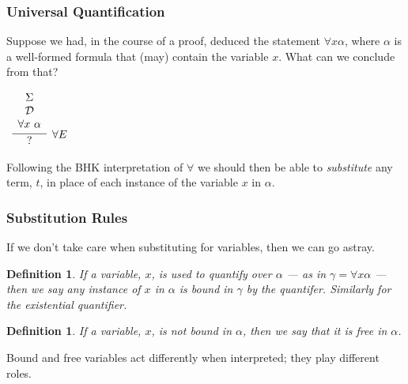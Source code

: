 \documentclass{beamer}
\theoremstyle{indentDefn} \newtheorem{defn}[]{Definition}
\begin{document}
\begin{frame}
	\frametitle{Universal Quantification}
	
	Suppose we had, in the course of a proof, deduced the statement $\forall x \alpha$, where $\alpha$ is a well-formed formula that (may) contain the variable $x$. What can we conclude from that? 
	
	\vspace{0.5cm}
	
	\begin{center}
	$\begin{array}{c}
		\infer[\forall E]{\hspace{0.3cm} ? \hspace{0.3cm}}{\begin{array}{c} 
			\Sigma \\
			\mathcal{D} \\ 
			\forall x \ \alpha			
			\end{array}}
	\end{array}$
	\end{center}

	Following the BHK interpretation of $\forall$ we should then be able to \emph{substitute} any term, $t$, in place of each instance of the variable $x$ in $\alpha$.
\end{frame}

\begin{frame}
	\frametitle{Substitution Rules}
	
	If we don't take care when substituting for variables, then we can go astray. 
	
	\vspace{0.5cm}	

	\begin{defn}
		If a variable, $x$, is used to quantify over $\alpha$ --- as in $\gamma = \forall x \alpha$ --- then we say any instance of $x$ in $\alpha$ is \emph{bound} in $\gamma$ by the quantifer. Similarly for the existential quantifier. 
	\end{defn} 

	
	\vspace{0.5cm} 

	\begin{defn}
		If a variable, $x$, is not bound in $\alpha$, then we say that it is free in $\alpha$.
	\end{defn}

	\vspace{0.5cm} 
	
	Bound and free variables act differently when interpreted; they play different roles. 
	
\end{frame}
\end{document}
